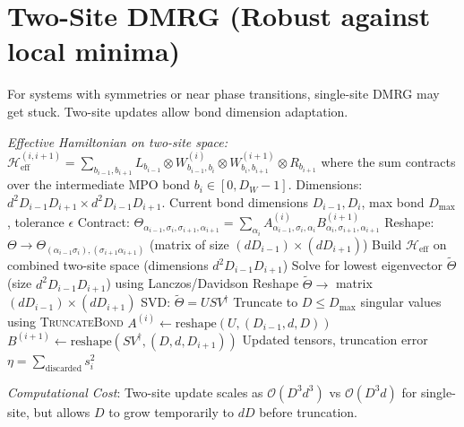 \documentclass[aps,prb,onecolumn,scriptaddress]{revtex4-2}
\newcommand{\eps}{\epsilon}
\newcommand{\Order}{\mathcal{O}}
\begin{document}
	\section{Two-Site DMRG (Robust against local minima)}
	
	For systems with symmetries or near phase transitions, single-site DMRG may get stuck. Two-site updates allow bond dimension adaptation.
	
	\begin{algorithm}[H]
		\caption{TwoSiteUpdate}
		\begin{algorithmic}[1]
			\Statex \textit{Effective Hamiltonian on two-site space:}
			\Statex $\mathcal{H}_{\text{eff}}^{(i,i+1)} = \sum_{b_{i-1}, b_{i+1}} L_{b_{i-1}} \otimes W^{(i)}_{b_{i-1},b_i} \otimes W^{(i+1)}_{b_i,b_{i+1}} \otimes R_{b_{i+1}}$
			\Statex where the sum contracts over the intermediate MPO bond $b_i \in [0, D_W-1]$.
			\Statex Dimensions: $d^2 D_{i-1} D_{i+1} \times d^2 D_{i-1} D_{i+1}$.
			\Require Current bond dimensions $D_{i-1}, D_i$, max bond $D_{\max}$, tolerance $\eps$					
			\State Contract: $\Theta_{\alpha_{i-1},\sigma_i,\sigma_{i+1},\alpha_{i+1}} = \sum_{\alpha_i} A^{(i)}_{\alpha_{i-1},\sigma_i,\alpha_i} B^{(i+1)}_{\alpha_i,\sigma_{i+1},\alpha_{i+1}}$
			\State Reshape: $\Theta \to \Theta_{(\alpha_{i-1}\sigma_i), (\sigma_{i+1}\alpha_{i+1})}$ (matrix of size $(d D_{i-1}) \times (d D_{i+1})$)
			\State Build $\mathcal{H}_{\text{eff}}$ on combined two-site space (dimensions $d^2 D_{i-1} D_{i+1}$)
			\State {}
			\State {}
			\State Solve for lowest eigenvector $\tilde{\Theta}$ (size $d^2 D_{i-1} D_{i+1}$) using Lanczos/Davidson
			\State Reshape $\tilde{\Theta} \to$ matrix $(d D_{i-1}) \times (d D_{i+1})$
			\State SVD: $\tilde{\Theta} = U S V^\dagger$
			\State Truncate to $D \leq D_{\max}$ singular values using \textsc{TruncateBond}
			\State $A^{(i)} \gets \text{reshape}(U, (D_{i-1}, d, D))$ 
			\State $B^{(i+1)} \gets \text{reshape}(S V^\dagger, (D, d, D_{i+1}))$ 
			\State \Return Updated tensors, truncation error $\eta = \sum_{\text{discarded}} s_i^2$
		\end{algorithmic}
	\end{algorithm}
	
	\textit{Computational Cost}: Two-site update scales as $\Order(D^3 d^3)$ vs $\Order(D^3 d)$ for single-site, but allows $D$ to grow temporarily to $d D$ before truncation.
	
\end{document}
